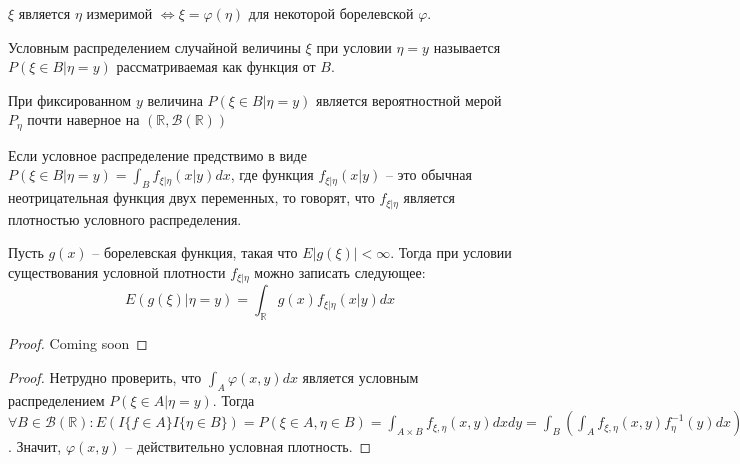 \documentclass[document.tex]{subfiles}
\begin{document}
\begin{corollary}
    $\xi$ является $\eta$ измеримой $\Leftrightarrow \xi = \varphi(\eta)$ для некоторой борелевской $\varphi$.
\end{corollary}

\begin{definition}
    Условным распределением случайной величины $\xi$ при условии $\eta = y$ называется $P(\xi \in B | \eta = y)$
    рассматриваемая как функция от $B$.
\end{definition}

\begin{statement}
    При фиксированном $y$ величина $P(\xi \in B | \eta = y)$ является вероятностной мерой $P_{\eta}$ почти наверное на $(\mathbb{R},
    \mathcal{B}(\mathbb{R}))$
\end{statement}

\begin{definition}
    Если условное распределение предствимо в виде $P(\xi \in B | \eta = y) = \int_B f_{\xi | \eta}(x | y) dx$, где
    функция $f_{\xi | \eta}(x | y)$ -- это обычная неотрицательная функция двух переменных, то говорят, что
    $f_{\xi | \eta}$ является плотностью условного распределения.
\end{definition}

\begin{theorem}
    Пусть $g(x)$ -- борелевская функция, такая что $E|g(\xi)| < \infty$. Тогда при условии существования условной
    плотности $f_{\xi | \eta}$ можно записать следующее:
    \[
        E(g(\xi) | \eta = y) = \int_{\mathbb{R}} g(x) f_{\xi | \eta}(x | y) dx
    \]
\end{theorem}

\begin{proof}
    Coming soon
\end{proof}

\begin{proof}
    Нетрудно проверить, что $\int_A \varphi(x, y) dx$ является условным распределением $P(\xi \in A | \eta = y)$. Тогда
    $\forall B \in \mathcal{B}(\mathbb{R}): E(I\{f \in A\} I\{\eta \in B\}) = P(\xi \in A, \eta \in B) = \int_{A \times
    B} f_{\xi, \eta}(x, y) dx dy  = \int_B \left( \int_A f_{\xi, \eta}(x, y) f_{\eta}^{-1}(y) dx \right) f_{\eta}(y)
    dy = \int_B \left( \int_A \varphi(x, y) dx \right) P_{\eta}(dy) = \int_B P(\xi \in A | \eta = y) P_{\eta}(dy)$.
    Значит, $\varphi(x, y)$ -- действительно условная плотность.
\end{proof}
\end{document}
